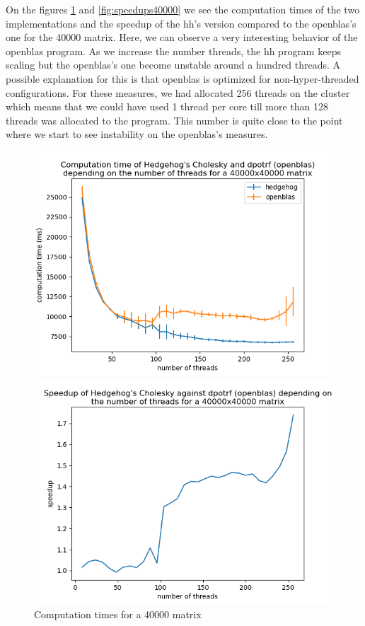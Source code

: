 On the figures \ref{fig:time40000} and \ref{fig:speedups40000} we see the
computation times of the two implementations and the speedup of the \gls{hh}'s
version compared to the openblas's one for the 40000 matrix. Here, we can
observe a very interesting behavior of the openblas program. As we increase the
number threads, the \gls{hh} program keeps scaling but the openblas's one become
unstable around a hundred threads. A possible explanation for this is that
openblas is optimized for non-hyper-threaded configurations. For these measures,
we had allocated 256 threads on the cluster which means that we could have used
1 thread per core till more than 128 threads was allocated to the program. This
number is quite close to the point where we start to see instability on the
openblas's measures.

\begin{figure}[!htb]
  \begin{minipage}{0.48\linewidth}
    \centering
    \includegraphics[scale=0.5]{img/cho-img/times-40000.png}
    \caption{Computation times for a 40000 matrix}
    \label{fig:time40000}
  \end{minipage}\hfill
  \begin{minipage}{0.48\linewidth}
    \centering
    \includegraphics[scale=0.5]{img/cho-img/speedup-40000.png}

\end{minipage}
\end{figure}
